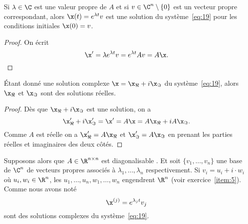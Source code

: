 \begin{lemma}
  \label{lem:15}
  Si $\lambda \in \C$ est une valeur propre de $A$ et si $v \in \C^n \setminus \{0\}$ est un vecteur propre correspondant, alors $\x(t) = e^{\lambda t} v$ est  une solution du système~\eqref{eq:19} pour les conditions initiales $\x(0) = v$. 
\end{lemma}
\begin{proof}
  On écrit 
  \begin{displaymath}
    \x' = \lambda e^{\lambda t} v = e^{\lambda t} Av = A\x.
  \end{displaymath}
\end{proof}


\begin{lemma}
  \label{lem:14}
  Étant donné une solution complexe $\x = \x_\Re + i \x_\Im$ du système~\eqref{eq:19}, alors $\x_\Re$ et $\x_\Im$ sont des solutions réelles.  
\end{lemma}
\begin{proof}
  Dès que $\x_\Re + i \x_\Im $ est une solution, on a 
  \begin{displaymath}
   \x'_\Re+ i \x'_\Im = \x' = A \x = A\x_\Re + i A\x_\Im. 
  \end{displaymath}
Comme $A $ est réelle on a $\x_\Re' = A\x_\Re$ et $\x'_\Im = A \x_\Im$ en prenant les parties réelles et imaginaires des deux côtés. 
\end{proof}


Supposons alors que $A \in \R^{n \times n}$ est diagonalisable . Et soit $\{v_1,\dots,v_n\}$ une base de $\C^n$ de vecteurs propres associés à 
$\lambda_1,\dots,\lambda_n$ respectivement. Si $v_i = u_i + i \cdot w_i$  où $u_i,w_i \in \R^n$, les $u_1,\dots,u_n,w_1,\dots,w_n$ engendrent $\R^n$ (voir exercice~\ref{item:5}). Comme nous avons noté 
\begin{displaymath}
  \x^{(j)} = e^{\lambda_j t} v_j
\end{displaymath}
sont des solutions complexes du système~\eqref{eq:19}.   

